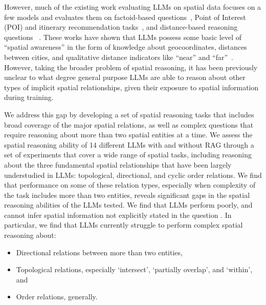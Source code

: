 However, much of the existing work evaluating LLMs on spatial data focuses on a few models and evaluates them on factoid-based questions~\cite{Qi2023,Roberts2023,Gupta2024,Yan2024}, Point of Interest (POI) and itinerary recommendation tasks~\cite{Schneider2025,Yu2025,Roberts2023,Xie2024,Gundawar2024,De2024}, and distance-based reasoning questions~\cite{Bhandari2023,Osullivan2024} .
These works have shown that LLMs possess some basic level of ``spatial awareness'' in the form of knowledge about geocoordinates, distances between cities, and qualitative distance indicators like ``near'' and ``far''~\cite{Bhandari2023,Qi2023,Osullivan2024}.
However, taking the broader problem of spatial reasoning, it has been previously unclear to what degree general purpose LLMs are able to reason about other types of implicit spatial relationships, given their exposure to spatial information during training.

We address this gap by developing a set of spatial reasoning tasks that includes broad coverage of the major spatial relations, as well as complex questions that require reasoning about more than two spatial entities at a time.
We assess the spatial reasoning ability of 14 different LLMs with and without RAG through a set of experiments that cover a wide range of spatial tasks, including reasoning about the three fundamental spatial relationships that have been largely understudied in LLMs: topological, directional, and cyclic order relations.
We find that performance on some of these relation types, especially when complexity of the task includes more than two entities, reveals significant gaps in the spatial reasoning abilities of the LLMs tested. 
We find that LLMs perform poorly, and cannot infer spatial information not explicitly stated in the question .
In particular, we find that LLMs currently struggle to perform complex spatial reasoning about:

\begin{itemize}
    \item Directional relations between more than two entities, 
    \item Topological relations, especially `intersect', `partially overlap', and `within', and
    \item Order relations, generally.
\end{itemize}

